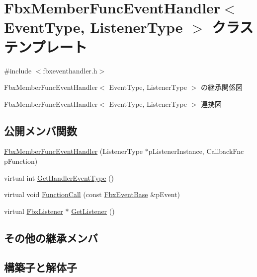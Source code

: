\hypertarget{class_fbx_member_func_event_handler}{}\section{Fbx\+Member\+Func\+Event\+Handler$<$ Event\+Type, Listener\+Type $>$ クラステンプレート}
\label{class_fbx_member_func_event_handler}


{\ttfamily \#include $<$fbxeventhandler.\+h$>$}



Fbx\+Member\+Func\+Event\+Handler$<$ Event\+Type, Listener\+Type $>$ の継承関係図


Fbx\+Member\+Func\+Event\+Handler$<$ Event\+Type, Listener\+Type $>$ 連携図
\subsection*{公開メンバ関数}
\begin{DoxyCompactItemize}
\item 
\hyperlink{class_fbx_member_func_event_handler_aea54f8e7f5579f28f715c5a9b8e1e9d5}{Fbx\+Member\+Func\+Event\+Handler} (Listener\+Type $\ast$p\+Listener\+Instance, Callback\+Fnc p\+Function)
\item 
virtual int \hyperlink{class_fbx_member_func_event_handler_a57856423663f283503e6498a7eacb0b4}{Get\+Handler\+Event\+Type} ()
\item 
virtual void \hyperlink{class_fbx_member_func_event_handler_a4bcb037442927d480776bc2fb4b7bcd6}{Function\+Call} (const \hyperlink{class_fbx_event_base}{Fbx\+Event\+Base} \&p\+Event)
\item 
virtual \hyperlink{class_fbx_listener}{Fbx\+Listener} $\ast$ \hyperlink{class_fbx_member_func_event_handler_ad45db7b531f23f9e7776c93bec100668}{Get\+Listener} ()
\end{DoxyCompactItemize}
\subsection*{その他の継承メンバ}


\subsection{構築子と解体子}
\mbox{\label{class_fbx_member_func_event_handler_aea54f8e7f5579f28f715c5a9b8e1e9d5}} 
